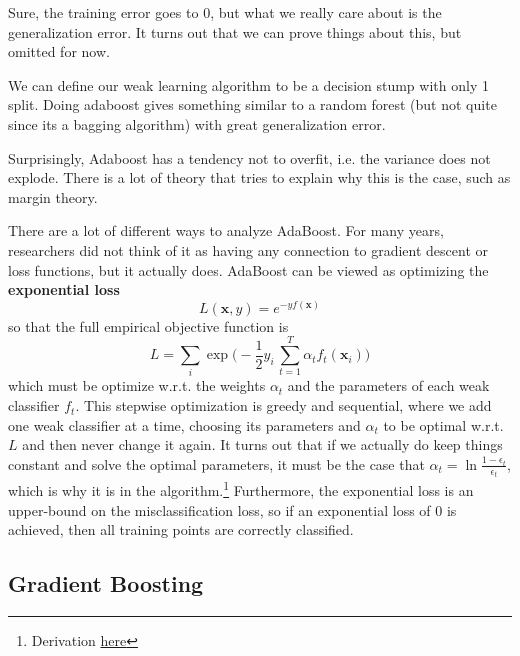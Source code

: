   Sure, the training error goes to $0$, but what we really care about is the generalization error. It turns out that we can prove things about this, but omitted for now. 

  \begin{example}
    \label{ex:adaboost-with-stumps}
    We can define our weak learning algorithm to be a decision stump with only 1 split. Doing adaboost gives something similar to a random forest (but not quite since its a bagging algorithm) with great generalization error. 
  \end{example}

  Surprisingly, Adaboost has a tendency not to overfit, i.e. the variance does not explode. There is a lot of theory that tries to explain why this is the case, such as margin theory. 

  There are a lot of different ways to analyze AdaBoost. For many years, researchers did not think of it as having any connection to gradient descent or loss functions, but it actually does. AdaBoost can be viewed as optimizing the \textbf{exponential loss} 
  \begin{equation}
    L(\mathbf{x}, y) = e^{-y f(\mathbf{x})} 
  \end{equation}
  so that the full empirical objective function is 
  \begin{equation}
    L = \sum_i \exp \bigg( -\frac{1}{2} y_i \, \sum_{t=1}^T \alpha_t f_t (\mathbf{x}_i)\bigg)
  \end{equation}
  which must be optimize w.r.t. the weights $\alpha_t$ and the parameters of each weak classifier $f_t$. This stepwise optimization is greedy and sequential, where we add one weak classifier at a time, choosing its parameters and $\alpha_t$ to be optimal w.r.t. $L$ and then never change it again. It turns out that if we actually do keep things constant and solve the optimal parameters, it must be the case that $\alpha_t = \ln \frac{1 - \epsilon_t}{\epsilon_t}$, which is why it is in the algorithm.\footnote{Derivation \href{https://www.cs.toronto.edu/~mbrubake/teaching/C11/Handouts/AdaBoost.pdf}{here}} Furthermore, the exponential loss is an upper-bound on the misclassification loss, so if an exponential loss of $0$ is achieved, then all training points are correctly classified. 

\subsection{Gradient Boosting}

